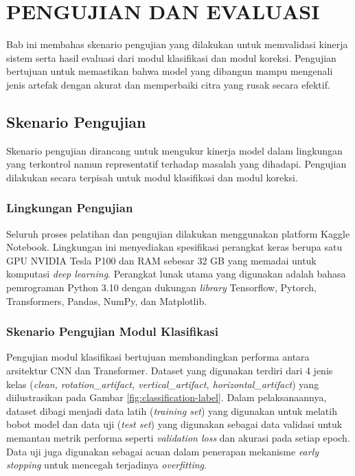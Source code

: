 \chapter{PENGUJIAN DAN EVALUASI}

Bab ini membahas skenario pengujian yang dilakukan untuk memvalidasi kinerja sistem serta hasil evaluasi dari modul klasifikasi dan modul koreksi. Pengujian bertujuan untuk memastikan bahwa model yang dibangun mampu mengenali jenis artefak dengan akurat dan memperbaiki citra yang rusak secara efektif.

\section{Skenario Pengujian}

Skenario pengujian dirancang untuk mengukur kinerja model dalam lingkungan yang terkontrol namun representatif terhadap masalah yang dihadapi. Pengujian dilakukan secara terpisah untuk modul klasifikasi dan modul koreksi.

\subsection{Lingkungan Pengujian}

Seluruh proses pelatihan dan pengujian dilakukan menggunakan platform Kaggle Notebook. Lingkungan ini menyediakan spesifikasi perangkat keras berupa satu GPU NVIDIA Tesla P100 dan RAM sebesar 32 GB yang memadai untuk komputasi \textit{deep learning}. Perangkat lunak utama yang digunakan adalah bahasa pemrograman Python 3.10 dengan dukungan \textit{library} Tensorflow, Pytorch, Transformers, Pandas, NumPy, dan Matplotlib. 

\subsection{Skenario Pengujian Modul Klasifikasi}

Pengujian modul klasifikasi bertujuan membandingkan performa antara arsitektur CNN dan Transformer. Dataset yang digunakan terdiri dari 4 jenis kelas (\textit{clean, rotation\_artifact, vertical\_artifact, horizontal\_artifact}) yang diilustrasikan pada Gambar \ref{fig:classification-label}. Dalam pelaksanaannya, dataset dibagi menjadi data latih (\textit{training set}) yang digunakan untuk melatih bobot model dan data uji (\textit{test set}) yang digunakan sebagai data validasi untuk memantau metrik performa seperti \textit{validation loss} dan akurasi pada setiap epoch. Data uji juga digunakan sebagai acuan dalam penerapan mekanisme \textit{early stopping} untuk mencegah terjadinya \textit{overfitting}.

